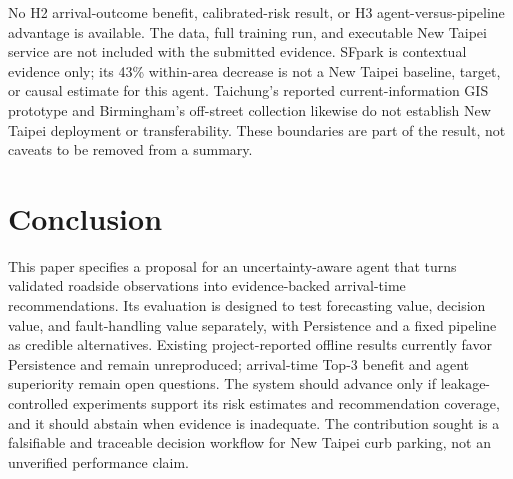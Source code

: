 \documentclass[conference,letterpaper,10pt]{IEEEtran}
\begin{document}
No H2 arrival-outcome benefit, calibrated-risk result, or H3 agent-versus-pipeline advantage is available. The data, full training run, and executable New Taipei service are not included with the submitted evidence. SFpark is contextual evidence only; its 43\% within-area decrease is not a New Taipei baseline, target, or causal estimate for this agent. Taichung's reported current-information GIS prototype and Birmingham's off-street collection likewise do not establish New Taipei deployment or transferability. These boundaries are part of the result, not caveats to be removed from a summary.

\section{Conclusion}
This paper specifies a proposal for an uncertainty-aware agent that turns validated roadside observations into evidence-backed arrival-time recommendations. Its evaluation is designed to test forecasting value, decision value, and fault-handling value separately, with Persistence and a fixed pipeline as credible alternatives. Existing project-reported offline results currently favor Persistence and remain unreproduced; arrival-time Top-3 benefit and agent superiority remain open questions. The system should advance only if leakage-controlled experiments support its risk estimates and recommendation coverage, and it should abstain when evidence is inadequate. The contribution sought is a falsifiable and traceable decision workflow for New Taipei curb parking, not an unverified performance claim.



\end{document}
